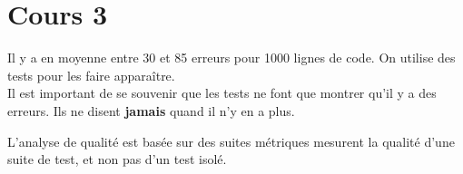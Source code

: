 \section{Cours 3}
Il y a en moyenne entre 30 et 85 erreurs pour 1000 lignes de code. On utilise des tests pour les faire apparaître.\\
Il est important de se souvenir que les tests ne font que montrer qu'il y a des erreurs. Ils ne disent \textbf{jamais}
quand il n'y en a plus.

L'analyse de qualité est basée sur des suites métriques mesurent la qualité d'une suite de test, et non pas d'un test
isolé.
